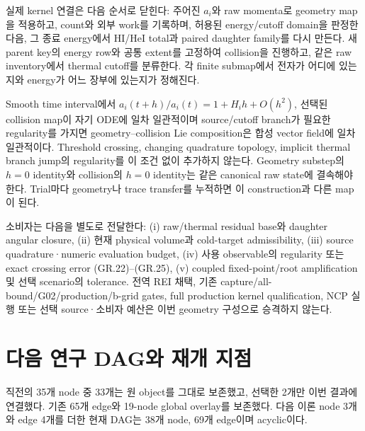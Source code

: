 실제 kernel 연결은 다음 순서로 닫힌다: 주어진 \(a_i\)와 raw momenta로 geometry map을 적용하고, count와 외부 work를 기록하며, 허용된 energy/cutoff domain을 판정한 다음, 그 종료 energy에서 HI/HeI total과 paired daughter family를 다시 만든다. 새 parent key의 energy row와 공통 extent를 고정하여 collision을 진행하고, 같은 raw inventory에서 thermal cutoff를 분류한다. 각 finite submap에서 전자가 어디에 있는지와 energy가 어느 장부에 있는지가 정해진다.

Smooth time interval에서 \(a_i(t+h)/a_i(t)=1+H_ih+O(h^2)\), 선택된 collision map이 자기 ODE에 일차 일관적이며 source/cutoff branch가 필요한 regularity를 가지면 geometry--collision Lie composition은 합성 vector field에 일차 일관적이다. Threshold crossing, changing quadrature topology, implicit thermal branch jump의 regularity를 이 조건 없이 추가하지 않는다. Geometry substep의 \(h=0\) identity와 collision의 \(h=0\) identity는 같은 canonical raw state에 결속해야 한다. Trial마다 geometry나 trace transfer를 누적하면 이 construction과 다른 map이 된다.

소비자는 다음을 별도로 전달한다: (i) raw/thermal residual base와 daughter angular closure, (ii) 현재 physical volume과 cold-target admissibility, (iii) source quadrature·numeric evaluation budget, (iv) 사용 observable의 regularity 또는 exact crossing error (GR.22)--(GR.25), (v) coupled fixed-point/root amplification 및 선택 scenario의 tolerance. 전역 REI 채택, 기존 capture/all-bound/G02/production/b-grid gates, full production kernel qualification, NCP 실행 또는 선택 source·소비자 예산은 이번 geometry 구성으로 승격하지 않는다.

\clearpage

\hypertarget{uxb2e4uxc74c-uxc5f0uxad6c-daguxc640-uxc7acuxac1c-uxc9c0uxc810}{%
\section{다음 연구 DAG와 재개 지점}\label{uxb2e4uxc74c-uxc5f0uxad6c-daguxc640-uxc7acuxac1c-uxc9c0uxc810}}

직전의 35개 node 중 33개는 원 object를 그대로 보존했고, 선택한 2개만 이번 결과에 연결했다. 기존 65개 edge와 19-node global overlay를 보존했다. 다음 이론 node 3개와 edge 4개를 더한 현재 DAG는 38개 node, 69개 edge이며 acyclic이다.

